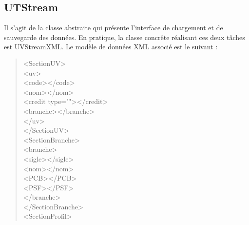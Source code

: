 \documentclass[a4paper,10pt,french]{report}
\begin{document}
				
	\subsection{UTStream}\label{subsec:UTStream}
	
		Il s'agit de la classe abstraite qui présente l'interface de chargement et de sauvegarde des données.
		En pratique, la classe concrête réalisant ces deux tâches est UVStreamXML. Le modèle de données XML associé est le suivant :
		\begin{quote}

<SectionUV>\\
	\hspace*{1cm}<uv>\\
	\hspace*{1cm}	\hspace*{1cm}<code></code>\\
	\hspace*{1cm}	</nom>\\
	\hspace*{1cm}\hspace*{1cm}	<credit type=""></credit>\\
	\hspace*{1cm}\hspace*{1cm}	<branche></branche>\\
	\hspace*{1cm}</uv>\\
</SectionUV>\\
<SectionBranche>\\
	\hspace*{1cm}<branche>\\
	\hspace*{1cm}\hspace*{1cm}	<sigle></sigle>\\
	\hspace*{1cm}\hspace*{1cm}	<nom></nom>\\
	\hspace*{1cm}\hspace*{1cm}	<PCB></PCB>\\
	\hspace*{1cm}\hspace*{1cm}	<PSF></PSF>\\
	\hspace*{1cm}</branche>\\
</SectionBranche>\\
<SectionProfil>\\

\end{quote}
\end{document}
